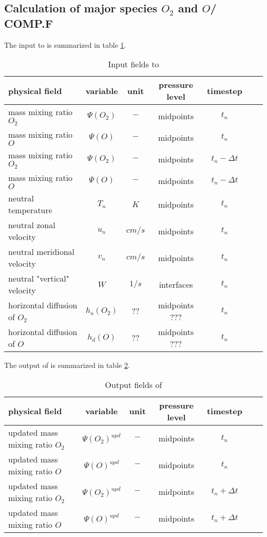 \subsection{Calculation of major species  $O_2$ and $O$/ COMP.F}\label{subcap:comp}
%
The input to  is summarized in table
\ref{tab:input_comp}.
%
\begin{table}[tb]
\begin{tabular}{|p{3.5cm} ||c|c|c|c|c|c|} \hline
physical field               & variable        & unit&pressure
level& timestep
\\ \hline \hline
%
mass mixing ratio $O_2$ &       $\Psi(O_2)$              & $-$   &  midpoints & $t_n$\\
mass mixing ratio $O$ &         $\Psi(O  )$              & $-$   &  midpoints & $t_n$\\
mass mixing ratio $O_2$ &       $\Psi(O_2)$              & $-$   &  midpoints & $t_n-\Delta t$\\
mass mixing ratio $O$ &         $\Psi(O  )$              & $-$   &  midpoints & $t_n- \Delta t$\\
neutral temperature &        $T_n$              & $K$   &  midpoints & $t_n$\\
neutral zonal velocity &       $u_n$              & $cm/s$   &  midpoints & $t_n$\\
neutral meridional velocity &       $v_n$              & $cm/s$   &  midpoints & $t_n$\\
neutral "vertical" velocity &       $W$              & $1/s$   &  interfaces & $t_n$\\
horizontal diffusion of $O_2$ &       $h_a(O_2)$              & $??$   &  midpoints ??? & $t_n$\\
horizontal diffusion of $O$ &       $h_d(O)$              & $??$ &
midpoints ??? & $t_n$
 \\ \hline
\end{tabular}
\caption{Input fields to }
\label{tab:input_comp}
\end{table}
%
The output of  is summarized in table
\ref{tab:output_comp}.
%
\begin{table}[tb]
\begin{tabular}{|p{3.5cm} ||c|c|c|c|c|c|} \hline
physical field               & variable        & unit&pressure
level& timestep \\ \hline \hline
updated mass mixing ratio $O_2$ &       $\Psi(O_2)^{upd}$              & $-$   &  midpoints & $t_n$\\
updated mass mixing ratio $O$ &         $\Psi(O  )^{upd}$              & $-$   &  midpoints & $t_n$\\
updated mass mixing ratio $O_2$ &       $\Psi(O_2)^{upd}$              & $-$   &  midpoints & $t_n+\Delta t$\\
updated mass mixing ratio $O$ &         $\Psi(O  )^{upd}$ & $-$   &
midpoints & $t_n+ \Delta t$
\\ \hline \hline
\end{tabular}
\caption{Output fields of }
\label{tab:output_comp}
\end{table}
